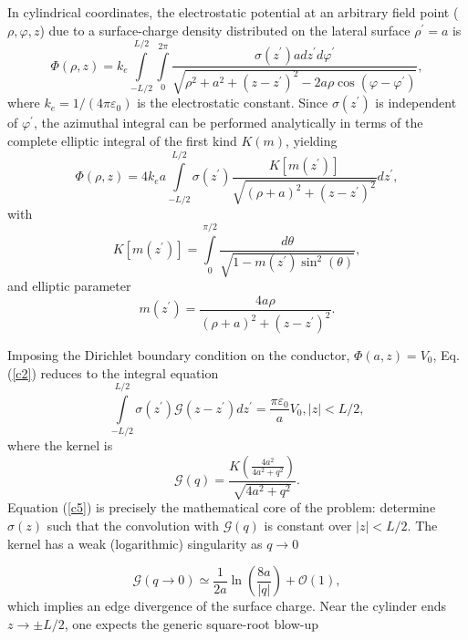 \documentclass[12pt]{article}
\begin{document}
In cylindrical coordinates, the electrostatic potential at an arbitrary field
point ($\rho,\varphi,z$) due to a surface-charge density distributed on the
lateral surface $\rho^{\prime}=a$ is%
\begin{equation}
\Phi(\rho,z)=k_{e}\int\limits_{-L/2}^{L/2}\int\limits_{0}^{2\pi}%
\frac{\sigma(z^{\prime})adz^{\prime}d\varphi^{\prime}}{\sqrt{\rho^{2}%
+a^{2}+\left(  z-z^{\prime}\right)  ^{2}-2a\rho\cos(\varphi-\varphi^{\prime}%
)}}, \label{c1}%
\end{equation}
where $k_{e}=1/(4\pi\varepsilon_{0})$ is the electrostatic constant. Since
$\sigma(z^{\prime})$ is independent of $\varphi^{\prime}$, the azimuthal
integral can be performed analytically in terms of the complete elliptic
integral of the first kind $K(m)$, yielding%
\begin{equation}
\Phi(\rho,z)=4k_{e}a\int\limits_{-L/2}^{L/2}\sigma(z^{\prime}%
)\frac{K[m(z^{\prime})]}{\sqrt{\left(  \rho+a\right)  ^{2}+\left(
z-z^{\prime}\right)  ^{2}}}dz^{\prime}, \label{c2}%
\end{equation}
with%
\begin{equation}
K[m(z^{\prime})]=\int\limits_{0}^{\pi/2}\frac{d\theta}{\sqrt{1-m(z^{\prime
})\sin^{2}(\theta)}}, \label{c3}%
\end{equation}
and elliptic parameter%
\begin{equation}
m(z^{\prime})=\frac{4a\rho}{\left(  \rho+a\right)  ^{2}+\left(  z-z^{\prime
}\right)  ^{2}}. \label{c4}%
\end{equation}

Imposing the Dirichlet boundary condition on the conductor, $\Phi(a,z)=V_{0}
$, Eq. (\ref{c2}) reduces to the integral equation%
\begin{equation}
\int\limits_{-L/2}^{L/2}\sigma(z^{\prime})\mathcal{G}(z-z^{\prime})dz^{\prime
}=\frac{\pi\varepsilon_{0}}{a}V_{0},\left|  z\right|  <L/2, \label{c5}%
\end{equation}
where the kernel is%
\begin{equation}
\mathcal{G}(q)=\frac{K\left(  \frac{4a^{2}}{4a^{2}+q^{2}}\right)  }%
{\sqrt{4a^{2}+q^{2}}}. \label{c6}%
\end{equation}
Equation (\ref{c5}) is precisely the mathematical core of the problem:
determine $\sigma(z)$ such that the convolution with $\mathcal{G}(q)$ is
constant over $\left|  z\right|  <L/2$. The kernel has a weak (logarithmic)
singularity as $q\rightarrow0$%

\begin{equation}
\mathcal{G}(q\rightarrow0)\simeq\frac{1}{2a}\ln\left(  \frac{8a}{\left|
q\right|  }\right)  +\mathcal{O}(1), \label{c7}%
\end{equation}
which implies an edge divergence of the surface charge. Near the cylinder ends
$z\rightarrow\pm L/2$, one expects the generic square-root blow-up\cite{c2}%
\end{document}
